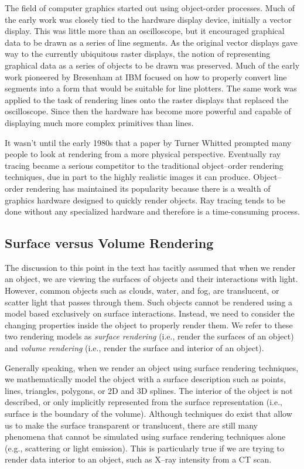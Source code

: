 The field of computer graphics started out using object-order processes. Much of the early work was closely tied to the hardware display device, initially a vector display. This was little more than an oscilloscope, but it encouraged graphical data to be drawn as a series of line segments. As the original vector displays gave way to the currently ubiquitous raster displays, the notion of representing graphical data as a series of objects to be drawn was preserved. Much of the early work pioneered by Bresenham \cite{Bresenham65} at IBM focused on how to properly convert line segments into a form that would be suitable for line plotters. The same work was applied to the task of rendering lines onto the raster displays that replaced the oscilloscope. Since then the hardware has become more powerful and capable of displaying much more complex primitives than lines.

It wasn't until the early 1980s that a paper by Turner Whitted \cite{Whitted80} prompted many people to look at rendering from a more physical perspective. Eventually ray tracing became a serious competitor to the traditional object--order rendering techniques, due in part to the highly realistic images it can produce. Object--order rendering has maintained its popularity because there is a wealth of graphics hardware designed to quickly render objects. Ray tracing tends to be done without any specialized hardware and therefore is a time-consuming process.

\subsection{Surface versus Volume Rendering}

The discussion to this point in the text has tacitly assumed that when we render an object, we are viewing the surfaces of objects and their interactions with light. However, common objects such as clouds, water, and fog, are translucent, or scatter light that passes through them. Such objects cannot be rendered using a model based exclusively on surface interactions. Instead, we need to consider the changing properties inside the object to properly render them. We refer to these two rendering models as \emph{surface rendering} (i.e., render the surfaces of an object) and \emph{volume rendering} (i.e., render the surface and interior of an object).

Generally speaking, when we render an object using surface rendering techniques, we mathematically model the object with a surface description such as points, lines, triangles, polygons, or 2D and 3D splines. The interior of the object is not described, or only implicitly represented from the surface representation (i.e., surface is the boundary of the volume). Although techniques do exist that allow us to make the surface transparent or translucent, there are still many phenomena that cannot be simulated using surface rendering techniques alone (e.g., scattering or light emission). This is particularly true if we are trying to render data interior to an object, such as X--ray intensity from a CT scan.

